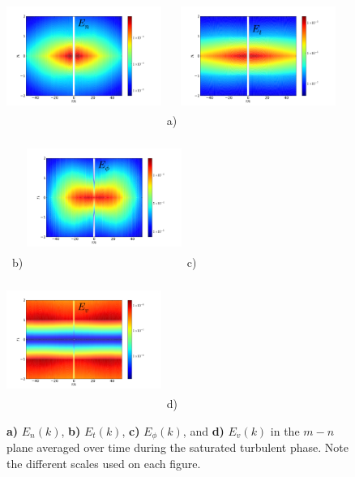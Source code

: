 \documentclass[12pt]{article}
\begin{document}
\begin{figure}
\includegraphics[width=0.45\textwidth,height=45mm]{En}~a)
\hfil
\includegraphics[width=0.45\textwidth,height=45mm]{Et}~b)
\hfil
\includegraphics[width=0.45\textwidth,height=45mm]{Ep}~c)
\hfil
\includegraphics[width=0.45\textwidth,height=45mm]{Ev}~d)
\hfil
\caption{\textbf{a)} $E_n(k)$, \textbf{b)} $E_t(k)$, \textbf{c)} $E_\phi(k)$, and \textbf{d)} $E_v(k)$ in the $m-n$ plane averaged over time during the saturated turbulent phase.
Note the different scales used on each figure.}
\label{energy_figures}
\end{figure}
\end{document}
